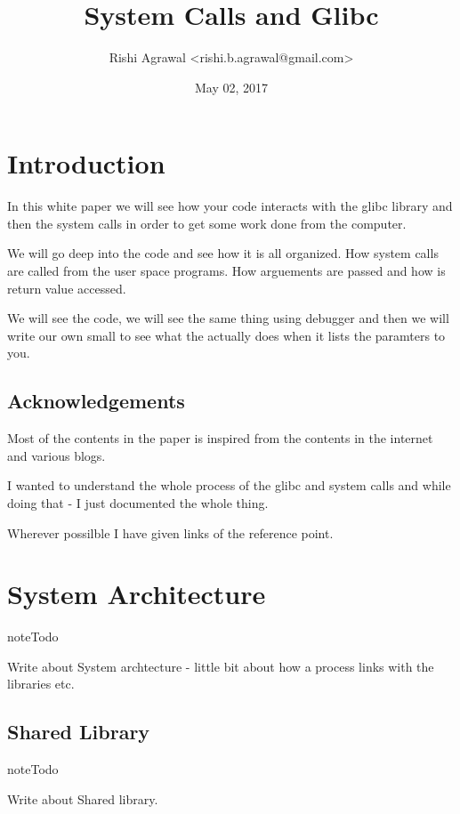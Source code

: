 \documentclass[letterpaper,10pt,english]{sphinxmanual}
\title{System Calls and Glibc}
\date{May 02, 2017}
\author{Rishi Agrawal <rishi.b.agrawal@gmail.com>}
\begin{document}
\maketitle
\sphinxtableofcontents
{}\label{\detokenize{index::doc}}



\chapter{Introduction}
\label{\detokenize{01_introduction:system-call-layer}}\label{\detokenize{01_introduction:introduction}}\label{\detokenize{01_introduction::doc}}
In this white paper we will see how your code interacts with the glibc library and
then the system calls in order to get some work done from the computer.

We will go deep into the code and see how it is all organized. How system calls
are called from the user space programs.  How arguements are passed and how is
return value accessed.

We will see the code, we will see the same thing using debugger and then we
will write our own small  to see what the   actually does when
it lists the paramters to you.


\section{Acknowledgements}
\label{\detokenize{01_introduction:acknowledgements}}
Most of the contents in the paper is inspired from the contents in the internet
and various blogs.

I wanted to understand the whole process of the glibc and system calls and
while doing that - I just documented the whole thing.

Wherever possilble I have given links of the reference point.


\chapter{System Architecture}
\label{\detokenize{02_system_calls:system-architecture}}\label{\detokenize{02_system_calls::doc}}
\begin{sphinxadmonition}{note}{Todo}

Write about System archtecture - little bit about how a process links with the libraries etc.
\end{sphinxadmonition}


\section{Shared Library}
\label{\detokenize{02_system_calls:shared-library}}
\begin{sphinxadmonition}{note}{Todo}

Write about Shared library.
\end{sphinxadmonition}
\end{document}
